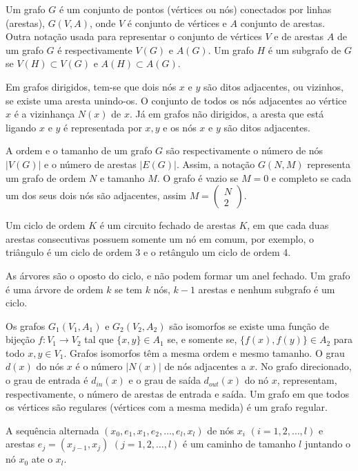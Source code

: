 \documentclass[brazil,ruledheader]{abnt}
\begin{document}
Um grafo $G$ é um conjunto de pontos (vértices ou nós) conectados por linhas
(arestas), $G(V,A)$, onde $V$ é conjunto de vértices e $A$ conjunto de arestas.
Outra notação usada para representar o conjunto de vértices $V$ e de arestas $A$
de um grafo $G$ é respectivamente $V(G)$ e $A(G)$. Um grafo $H$ é um subgrafo de
$G$ se $V(H) \subset V(G)$ e $A(H) \subset A(G)$.

Em grafos dirigidos, tem-se que dois nós $x$ e $y$ são ditos adjacentes, ou
vizinhos, se existe uma aresta unindo-os. O conjunto de todos os nós adjacentes
ao vértice $x$ é a vizinhança $N(x)$ de $x$. Já em grafos não dirigidos, a
aresta que está ligando $x$ e $y$ é representada por ${x, y}$ e os nós $x$ e $y$
são ditos adjacentes.

A ordem e o tamanho de um grafo $G$ são respectivamente o número de nós $|V(G)|$
e o número de arestas $|E(G)|$. Assim, a notação $G(N,M)$ representa um grafo de
ordem $N$ e tamanho $M$. O grafo é vazio se $M = 0$ e completo se cada um dos
seus dois nós são adjacentes, assim $M = \left(
\begin{array}{c}N\\2 \end{array}\right) $.

Um ciclo de ordem $K$ é um circuito fechado de arestas $K$, em que cada duas
arestas consecutivas possuem somente um nó em comum, por exemplo, o triângulo é
um ciclo de ordem 3 e o retângulo um ciclo de ordem 4.

As árvores são o oposto do ciclo, e não podem formar um anel fechado. Um grafo é
uma árvore de ordem $k$ se tem $k$ nós, $k-1$ arestas e nenhum subgrafo é um
ciclo.

Os grafos $G_1(V_1,A_1)$ e $G_2(V_2,A_2)$ são isomorfos se existe uma função de
bijeção $f: V_1 \rightarrow V_2$ tal que  $\{x,y\} \in A_1$ se, e somente se,
$\{f(x),f(y)\} \in A_2$ para todo $x,y \in V_1$. Grafos isomorfos têm a mesma
ordem e mesmo tamanho. O grau $d(x)$ do nós $x$ é o número $|N (x)|$ de nós
adjacentes a $x$. No grafo direcionado, o grau de entrada é $d_{in}(x)$ e o grau
de saída $d_{out}(x)$ do nó $x$, representam, respectivamente, o número de
arestas de entrada e saída.  Um grafo em que todos os vértices são regulares
(vértices com a mesma medida) é um grafo regular.

A sequência alternada $(x_0, e_1, x_1, e_2, \dots, e_l,x_l)$ de nós $x_i$ $(i =
1,2,\dots,l)$ e arestas  $e_j=(x_{j-1},x_j)$  $(j = 1,2,\dots,l)$  é um caminho
de tamanho $l$ juntando o nó $x_0$ ate o $x_l$. 
\end{document}
